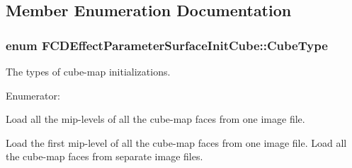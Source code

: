 \subsection{Member Enumeration Documentation}
\hypertarget{classFCDEffectParameterSurfaceInitCube_a59228097e934d37b9e8ae788a749bc07}{
\subsubsection[{CubeType}]{\setlength{\rightskip}{0pt plus 5cm}enum {\bf FCDEffectParameterSurfaceInitCube::CubeType}}}
\label{classFCDEffectParameterSurfaceInitCube_a59228097e934d37b9e8ae788a749bc07}
The types of cube-\/map initializations. \begin{Desc}
\item[Enumerator: ]\par
\begin{description}
\item[{\em 
\hypertarget{classFCDEffectParameterSurfaceInitCube_a59228097e934d37b9e8ae788a749bc07a5f20c13bdba2e0c6acd3616d3af70936}{
PRIMARY}
\label{classFCDEffectParameterSurfaceInitCube_a59228097e934d37b9e8ae788a749bc07a5f20c13bdba2e0c6acd3616d3af70936}
}]Load all the mip-\/levels of all the cube-\/map faces from one image file. \item[{\em 
\hypertarget{classFCDEffectParameterSurfaceInitCube_a59228097e934d37b9e8ae788a749bc07ad8ea23e52036e6ad637a7169021239f3}{
FACE}
\label{classFCDEffectParameterSurfaceInitCube_a59228097e934d37b9e8ae788a749bc07ad8ea23e52036e6ad637a7169021239f3}
}]Load the first mip-\/level of all the cube-\/map faces from one image file. Load all the cube-\/map faces from separate image files. \end{description}
\end{Desc}



